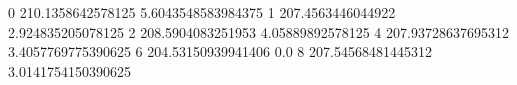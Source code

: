 0 210.1358642578125 5.6043548583984375
1 207.4563446044922 2.924835205078125
2 208.5904083251953 4.05889892578125
4 207.93728637695312 3.4057769775390625
6 204.53150939941406 0.0
8 207.54568481445312 3.0141754150390625
